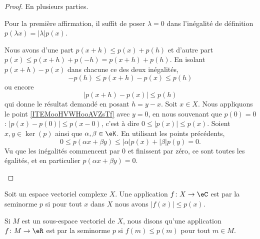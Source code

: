 \begin{proof}
	En plusieurs parties.
	\begin{subproof}
		Pour la première affirmation, il suffit de poser \( \lambda=0\) dans l'inégalité de définition \( p(\lambda x)=| \lambda |p(x)\).

		Nous avons d'une part \( p(x+h)\leq p(x)+p(h)\) et d'autre part \( p(x)\leq p(x+h)+p(-h)=p(x+h)+p(h)\). En isolant \( p(x+h)-p(x)\) dans chacune ce des deux inégalités,
		\begin{equation}
			-p(h)\leq p(x+h)-p(x)\leq p(h)
		\end{equation}
		ou encore
		\begin{equation}
			|p(x+h)-p(x)|\leq p(h)
		\end{equation}
		qui donne le résultat demandé en posant \( h=y-x\).
		Soit \( x\in X\). Nous appliquons le point \ref{ITEMooHVWHooAVZsTf} avec \( y=0\), en nous souvenant que \( p(0)=0\) : \( | p(x)-p(0) |\leq p(x-0)\), c'est à dire \( 0\leq | p(x) |\leq p(x)\).
		Soient \( x,y\in \ker(p)\) ainsi que \( \alpha,\beta\in \eK\). En utilisant les points précédents,
		\begin{equation}
			0\leq p(\alpha x+\beta y)\leq | \alpha |p(x)+| \beta |p(y)=0.
		\end{equation}
		Vu que les inégalités commencent par \( 0\) et finissent par zéro, ce sont toutes les égalités, et en particulier \( p(\alpha x+\beta y)=0\).
	\end{subproof}
\end{proof}

\begin{definition}		\label{DEFooNFOAooRAUuOk}
	Soit un espace vectoriel complexe \( X\). Une application \(f \colon X\to \eC  \) est  par la seminorme \( p\) si pour tout \( x\) dans \( X\) nous avons \( | f(x) |\leq p(x)\).

	Si \( M\) est un sous-espace vectoriel de \( X\), nous disons qu'une application \(f \colon M\to \eR  \) est  par la seminorme \( p\) si \( f(m)\leq p(m)\) pour tout \( m\in M\).
\end{definition}


